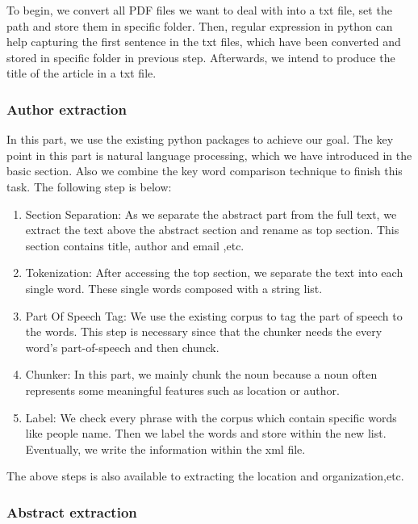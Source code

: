 To begin, we convert all PDF files we want to deal with into a txt file, set the path and store them in specific folder. 
Then, regular expression in python can help capturing the first sentence in the txt files, which have been converted and stored in specific folder in previous step.
Afterwards, we intend to produce the title of the article in a txt file.

\subsubsection{Author extraction}

In this part, we use the existing python packages to achieve our goal.
The key point in this part is natural language processing, which we have introduced in the basic section.
Also we combine the key word comparison technique to finish this task.
The following step is below:

\begin{enumerate}
	
	\item Section Separation: As we separate the abstract part from the full text, we extract the text above the abstract section and rename as top section. This section contains title, author and email ,etc.
	\item Tokenization: After accessing the top section, we separate the text into each single word. These single words composed with a string list. 
	\item Part Of Speech Tag: We use the existing corpus to tag the part of speech to the words. This step is necessary since that the chunker needs the every word's part-of-speech and then chunck.
	\item Chunker: In this part, we mainly chunk the noun because a noun often represents some meaningful features such as location or author.
	\item Label: We check every phrase with the corpus which contain specific words like people name. Then we label the words and store within the new list. Eventually, we write the information within the xml file. 
	
\end{enumerate}

The above steps is also available to extracting the location and organization,etc.

\subsubsection{Abstract extraction}

